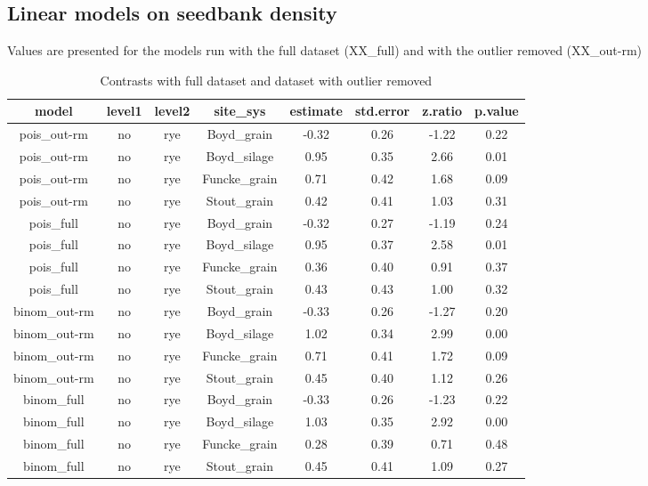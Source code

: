 \documentclass[]{article}
\begin{document}
\hypertarget{linear-models-on-seedbank-density}{%
\subsection{Linear models on seedbank
density}\label{linear-models-on-seedbank-density}}

Values are presented for the models run with the full dataset (XX\_full)
and with the outlier removed (XX\_out-rm)

\begin{table}[H]

\caption{\label{tab:unnamed-chunk-5}Contrasts with full dataset and dataset with outlier removed}
\centering
\begin{tabular}[t]{cccccccc}
\toprule
model & level1 & level2 & site\_sys & estimate & std.error & z.ratio & p.value\\
\midrule
\rowcolor{gray!6}  pois\_out-rm & no & rye & Boyd\_grain & -0.32 & 0.26 & -1.22 & 0.22\\
pois\_out-rm & no & rye & Boyd\_silage & 0.95 & 0.35 & 2.66 & 0.01\\
\rowcolor{gray!6}  pois\_out-rm & no & rye & Funcke\_grain & 0.71 & 0.42 & 1.68 & 0.09\\
pois\_out-rm & no & rye & Stout\_grain & 0.42 & 0.41 & 1.03 & 0.31\\
\rowcolor{gray!6}  pois\_full & no & rye & Boyd\_grain & -0.32 & 0.27 & -1.19 & 0.24\\
\addlinespace
pois\_full & no & rye & Boyd\_silage & 0.95 & 0.37 & 2.58 & 0.01\\
\rowcolor{gray!6}  pois\_full & no & rye & Funcke\_grain & 0.36 & 0.40 & 0.91 & 0.37\\
pois\_full & no & rye & Stout\_grain & 0.43 & 0.43 & 1.00 & 0.32\\
\rowcolor{gray!6}  binom\_out-rm & no & rye & Boyd\_grain & -0.33 & 0.26 & -1.27 & 0.20\\
binom\_out-rm & no & rye & Boyd\_silage & 1.02 & 0.34 & 2.99 & 0.00\\
\addlinespace
\rowcolor{gray!6}  binom\_out-rm & no & rye & Funcke\_grain & 0.71 & 0.41 & 1.72 & 0.09\\
binom\_out-rm & no & rye & Stout\_grain & 0.45 & 0.40 & 1.12 & 0.26\\
\rowcolor{gray!6}  binom\_full & no & rye & Boyd\_grain & -0.33 & 0.26 & -1.23 & 0.22\\
binom\_full & no & rye & Boyd\_silage & 1.03 & 0.35 & 2.92 & 0.00\\
\rowcolor{gray!6}  binom\_full & no & rye & Funcke\_grain & 0.28 & 0.39 & 0.71 & 0.48\\
\addlinespace
binom\_full & no & rye & Stout\_grain & 0.45 & 0.41 & 1.09 & 0.27\\
\bottomrule
\end{tabular}
\end{table}
\end{document}
